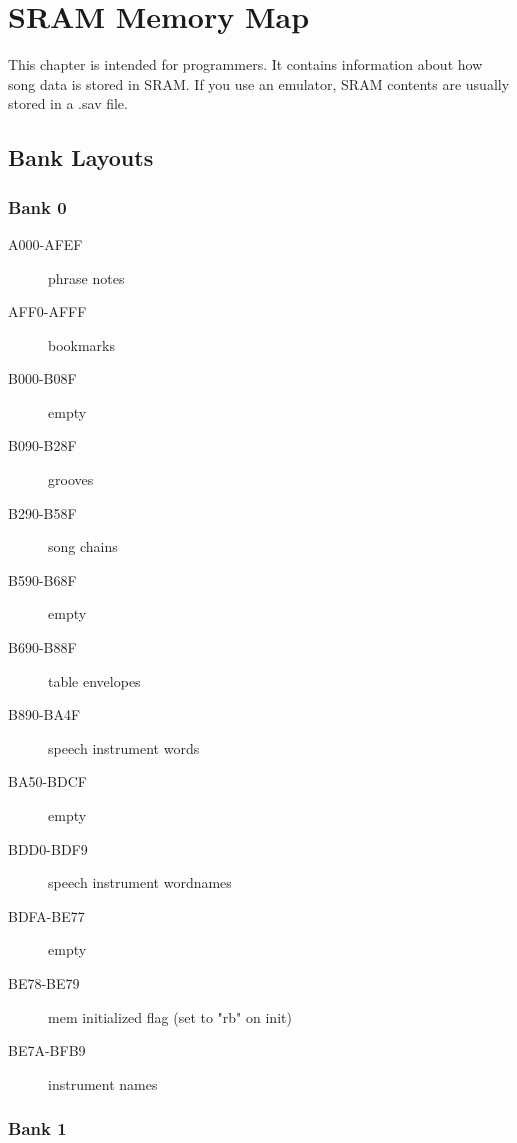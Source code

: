 \chapter{SRAM Memory Map}

This chapter is intended for programmers. It contains information about how song data is stored in SRAM. If you use an emulator, SRAM contents are usually stored in a .sav file.

\section{Bank Layouts}

\subsection{Bank 0}

\begin{description}
    \item[A000-AFEF] phrase notes
    \item[AFF0-AFFF] bookmarks
    \item[B000-B08F] empty
    \item[B090-B28F] grooves
    \item[B290-B58F] song chains
    \item[B590-B68F] empty
    \item[B690-B88F] table envelopes
    \item[B890-BA4F] speech instrument words
    \item[BA50-BDCF] empty
    \item[BDD0-BDF9] speech instrument wordnames
    \item[BDFA-BE77] empty
    \item[BE78-BE79] mem initialized flag (set to "rb" on init)
    \item[BE7A-BFB9] instrument names
\end{description}

\subsection{Bank 1}

